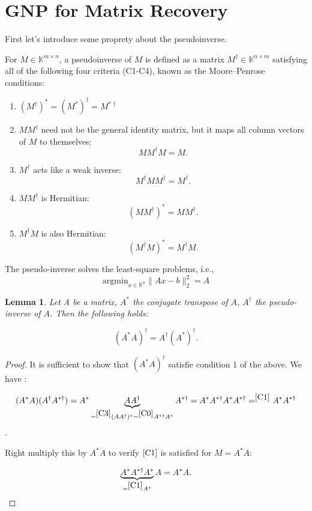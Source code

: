 \documentclass{article}
\newtheorem{lemma}{Lemma}
\newcommand{\pinv}[1]{#1^{\dagger}}
\begin{document}
\section{GNP for Matrix Recovery}
First let's introduce some proprety about the pseudoinverse.

For $M \in \mathbb{K}^{m \times n}$, a pseudoinverse of $M$ is defined as a matrix $M^\dagger \in \mathbb{K}^{n \times m}$ satisfying all of the following four criteria (C1-C4), known as the Moore–Penrose conditions:

\begin{enumerate}[label=c\arabic*),ref=c\arabic*, start=0]
    \item \label{C0} $(\pinv{M})^* = \pinv{(M^*)} = M^{* \dagger}$
    \item \label{C1} \(M\pinv{M}\) need not be the general identity matrix, but it maps all column vectors of \(M\) to themselves:
    \[M\pinv{M}M = M.\]
    
    \item \label{C2} \(\pinv{M}\) acts like a weak inverse:
    \[\pinv{M}M\pinv{M} = \pinv{M}.\]
    
    \item \label{C3} \(M\pinv{M}\) is Hermitian:
    \[(M\pinv{M})^{*} = M\pinv{M}.\]
    
    \item \label{C4} \(\pinv{M}M\) is also Hermitian:
    \[(\pinv{M}M)^{*} = \pinv{M}M.\]
\end{enumerate}
The pseudo-inverse solves the least-square problems, i.e., 
$$
\text{argmin}_{x \in \mathbb{R}^n} \| Ax - b \|_2^2 =A 
$$

\begin{lemma}
\label{l1}
Let A be a matrix, $A^*$ the conjugate transpose of $A$, $A^\dagger$ the pseudo-inverse of $A$. Then the following holds:

$$
(A^* A)^\dagger = A^\dagger (A^*)^\dagger.
$$
\end{lemma}

\begin{proof}
It is sufficient to show that $(A^* A)^\dagger$ satisfie condition 1 of the above. We have :

$$
(A^* A) (A^\dagger A^{* \dagger} ) = A^* \underbrace{A A^{\dagger}}_{=^{\ref{C3}}(AA^{\dagger})^* =^{\ref{C0}} A^{* \dagger} A^* } A^{* \dagger}  = A^* A^{* \dagger} A^* A^{* \dagger}  = ^{\ref{C1}} A^* {A^{* \dagger}}
$$.


Right multiply this by $A^* A$ to verify $\ref{C1}$ is satisfied for $M=A^* A$:

$$
 \underbrace{A^* A^{* \dagger} A^*}_{=^{\ref{C1}} A^*} A = A^* A. 
$$
\end{proof}
\end{document}
